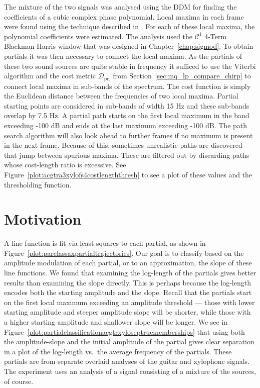 The mixture of the two signals was analysed using the DDM for finding the
coefficients of a cubic complex phase polynomial. Local maxima in each frame
were found using the technique described in \cite[p.~42]{serra1989system}. For
each of these local maxima, the polynomial coefficients were estimated. The
analysis used the $\mathcal{C}^{1}$ 4-Term Blackman-Harris window that was
designed in Chapter~\ref{chap:sigmod}. To obtain
partials it was then necessary to connect the local maxima. As the partials of
these two sound sources are quite stable in frequency it sufficed to use the
Viterbi algorithm \cite{forney1973viterbi} and the cost metric
$\mathcal{D}_{\text{pr.}}$ from Section~\ref{sec:mq_lp_compare_chirp} to connect
local maxima in sub-bands of the spectrum. The cost function is simply the
Euclidean distance between the frequencies of two local maxima. Partial starting
points are considered in sub-bands of width 15 Hz and these sub-bands overlap by
7.5 Hz. A partial path starts on the first local maximum in the band exceeding
-100 dB and ends at the last maximum exceeding -100 dB. The path search
algorithm will also look ahead to further frames if no maximum is present in the
next frame. Because of this, sometimes unrealistic paths are discovered that
jump between spurious maxima. These are filtered out by discarding paths whose
cost-length ratio is excessive. See
Figure~\ref{plot:acgtra3xylofs4costlengththresh} to see a plot of these values
and the thresholding function. 

\section{Motivation}

A line function is fit via least-squares to each partial, as shown in
Figure~\ref{plot:parclassaxpartialtrajectories}. Our goal is to classify based
on the amplitude modulation of each partial, or to an approximation, the slope of these line functions. We found that examining the log-length of the
partials gives better results than examining the slope directly. This is perhaps
because the log-length encodes both the starting amplitude and the slope. Recall
that the partials start on the first local maximum exceeding an amplitude
threshold --- those with lower starting amplitude and steeper amplitude slope will be
shorter, while those with a higher starting amplitude and shallower slope will
be longer. We see in
Figure~\ref{plot:partialclassificationacgtrxyloseptruememberships} that using
both the amplitude-slope and the initial amplitude of the partial gives clear
separation in a plot of the log-length vs.\ the
average frequency of
the partials. These partials are from separate overlaid analyses of the guitar
and xylophone signals. The experiment uses an analysis of a signal consisting of
a mixture of the sources, of course.

